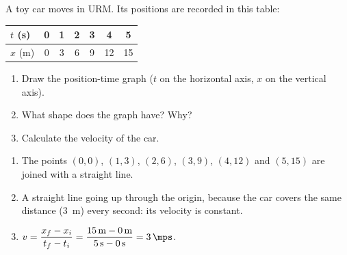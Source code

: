 \begin{exercise}
    A toy car moves in URM. Its positions are recorded in this table:
    \begin{center}
        \begin{tabular}{lcccccc}
            \toprule
            \(t\) (s) & 0 & 1 & 2 & 3 & 4 & 5 \\
            \midrule
            \(x\) (m) & 0 & 3 & 6 & 9 & 12 & 15 \\
            \bottomrule
        \end{tabular}
    \end{center}
    \begin{enumerate}[label=\letraminuscula]
        \item Draw the position-time graph (\(t\) on the horizontal axis, \(x\) on the vertical axis).
        \item What shape does the graph have? Why?
        \item Calculate the velocity of the car.
    \end{enumerate}
    \begin{solu}
        \begin{enumerate}[label=\alph*)]
            \item The points \((0,0)\), \((1,3)\), \((2,6)\), \((3,9)\), \((4,12)\) and \((5,15)\) are joined with a straight line.
    \begin{center}
            \end{center}
            \item A straight line going up through the origin, because the car covers the same distance (\qty{3}{\m}) every second: its velocity is constant.
            \item \(v = \dfrac{x_f - x_i}{t_f - t_i} = \dfrac{\qty{15}{\m} - \qty{0}{\m}}{\qty{5}{\s} - \qty{0}{\s}} = \qty{3}{\mps}\).
        \end{enumerate}
    \end{solu}
\end{exercise}

